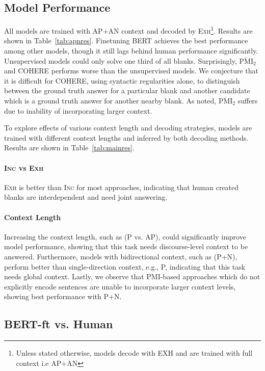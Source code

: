 \documentclass[11pt,a4paper]{article}
\begin{document}
\subsection{Model Performance}
All models are trained with AP+AN context and decoded by \textsc{Exh}\footnote{Unless stated otherwise, models decode with EXH and are trained with full context i.e AP+AN}. Results are shown in Table~\ref{tab:apnres}. Finetuning BERT achieves the best performance among other models, though it still lags behind human performance significantly. Unsupervised models could only solve one third of all blanks. Surprisingly, $\overline{\textrm{PMI}}_{2}$ and \textsc{COHERE} performs worse than the unsupervised models.  We conjecture that it is difficult for COHERE, using syntactic regularities alone, to distinguish between the ground truth answer for a particular blank and another candidate which is a ground truth answer for another nearby blank. As noted, $\overline{\textrm{PMI}}_{2}$ suffers due to inability of incorporating larger context.

\label{sec:model_experiments}
To explore effects of various context length and decoding strategies, models are trained with different context lengths and inferred by both decoding methods. Results are shown in Table~\ref{tab:mainres}.
\paragraph{\textsc{Inc} vs \textsc{Exh}} \textsc{Exh} is better than \textsc{Inc} for most approaches, indicating that human created blanks are interdependent and need joint answering. 
\paragraph{Context Length} Increasing the context length, such as (P vs. AP), could significantly improve model performance, showing that this task needs discourse-level context to be answered. Furthermore, models with bidirectional context, such as (P+N), perform better than single-direction context, e.g., P, indicating that this task needs global context. Lastly, we observe that PMI-based approaches which do not explicitly encode sentences are unable to incorporate larger context levels, showing best performance with \textsc{P+N}.


\subsection{BERT-ft vs. Human}
\end{document}
